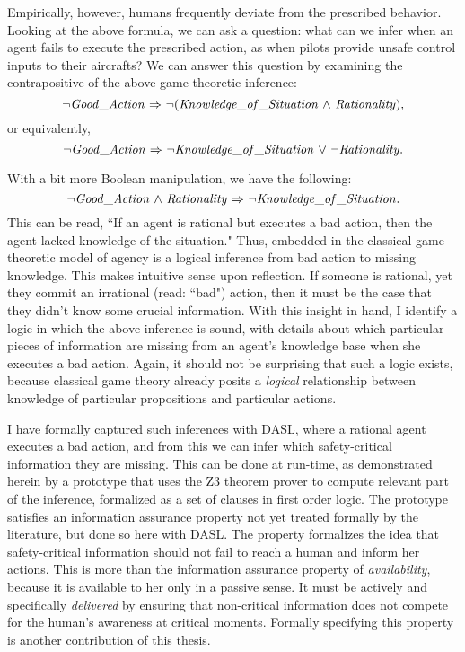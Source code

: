 Empirically, however, humans frequently deviate from the prescribed behavior. Looking at the above formula, we can ask a question: what can we infer when an agent fails to execute the prescribed action, as when pilots provide unsafe control inputs to their aircrafts? We can answer this question by examining the contrapositive of the above game-theoretic inference:
\begin{equation*}
{\neg} \mathit{Good\_Action} {\ \Rightarrow \ } {\neg} (\mathit{Knowledge\_of\_Situation} {\ \wedge \ } \mathit{Rationality}),
\end{equation*}
or equivalently,
\begin{equation*}
{\neg} \mathit{Good\_Action} {\ \Rightarrow \ } {\neg} \mathit{Knowledge\_of\_Situation} {\ \vee \ } {\neg} \mathit{Rationality}.
\end{equation*}
 
With a bit more Boolean manipulation, we have the following:
\begin{equation*}
{\neg} \mathit{Good\_Action} {\ \wedge \ } \mathit{Rationality} {\ \Rightarrow \ } {\neg} \mathit{Knowledge\_of\_Situation}.
\end{equation*}
This can be read, ``If an agent is rational but executes a bad action, then the agent lacked knowledge of the situation." Thus, embedded in the classical game-theoretic model of agency is a logical inference from bad action to missing knowledge. This makes intuitive sense upon reflection. If someone is rational, yet they commit an irrational (read: ``bad") action, then it must be the case that they didn't know some crucial information. With this insight in hand, I identify a logic in which the above inference is sound, with details about which particular pieces of information are missing from an agent's knowledge base when she executes a bad action. Again, it should not be surprising that such a logic exists, because classical game theory already posits a \emph{logical} relationship between knowledge of particular propositions and particular actions.

I have formally captured such inferences with DASL, where a rational agent executes a bad action, and from this we can infer which safety-critical information they are missing. This can be done at run-time, as demonstrated herein by a prototype that uses the Z3 theorem prover to compute relevant part of the inference, formalized as a set of clauses in first order logic. The prototype satisfies an information assurance property not yet treated formally by the literature, but done so here with DASL. The property formalizes the idea that safety-critical information should not fail to reach a human and inform her actions. This is more than the information assurance property of \emph{availability}, because it is available to her only in a passive sense. It must be actively and specifically \emph{delivered} by ensuring that non-critical information does not compete for the human's awareness at critical moments. Formally specifying this property is another contribution of this thesis. 

